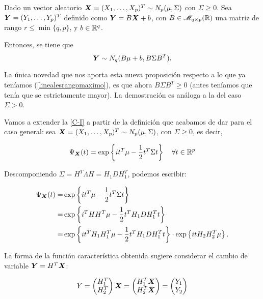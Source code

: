 \begin{nprop}
  Dado un vector aleatorio $\boldsymbol{X}  = (X_1,\dots,X_p)^T \sim N_p(\mu,\Sigma)$ con $\Sigma \geq 0$. Sea $\boldsymbol{Y} = (Y_1,\dots,Y_p)^T$ definido como $\boldsymbol{Y} = B\boldsymbol{X} + b$, con $B\in \mathscr{M}_{q\times p}(\mathbb{R})$ una matriz de rango $r \leq \min \{q,p\}$, y $b \in \mathbb{R}^q$.

  Entonces, se tiene que
  \[
    \boldsymbol{Y} \sim N_q(B\mu+b, B\Sigma B^T).
  \]
\end{nprop}

\begin{nota}
  La única novedad que nos aporta esta nueva proposición respecto a lo que ya teníamos (\ref{linealesrangomaximo}), es que ahora $B\Sigma B^T \geq 0$ (antes teníamos que tenía que se estrictamente mayor).
La demostración es análoga a la del caso $\Sigma > 0$.
\end{nota}


Vamos a extender la \hyperref[posvar:car-i]{[C-I]} a partir de la definición que acabamos de dar para el caso general:
sea $\boldsymbol{X} = (X_1,\dots,X_p)^T\sim N_p(\mu,\Sigma)$, con $\Sigma \ge 0$, es decir,

\[
\Psi_{\boldsymbol{X}}(t) = \exp\left\{it^T\mu - \frac{1}{2}t^T\Sigma t\right\} \quad \forall t\in \mathbb R^p
\]

Descomponiendo $\Sigma = H^T\Lambda H = H_1 D H_1^T$, podemos escribir:

\[
\begin{split}
  \Psi_{\boldsymbol{X}}(t) = & \exp\left\{it^T\mu - \frac{1}{2}t^T\Sigma t\right\} \\
  = & \exp\left\{i^T HH^T \mu - \frac{1}{2}t^T H_1 D H_1^T t\right\} \\
  = & \exp\left\{it^T H_1 H_1^T\mu - \frac{1}{2}t^T H_1DH_1^Tt\right\} \cdot \exp\left\{itH_2H_2^T \mu\right\}
  .
\end{split}
\]

La forma de la función característica obtenida sugiere considerar el cambio de variable $\boldsymbol{Y} = H^T\boldsymbol{X}$:

\[
Y = \begin{pmatrix} H_1^T \\ H_2^T \end{pmatrix} \boldsymbol{X}=\begin{pmatrix} H_1^T \boldsymbol{X} \\ H_2^T\boldsymbol{X} \end{pmatrix} = \begin{pmatrix} Y_1 \\ Y_2 \end{pmatrix}
\]

